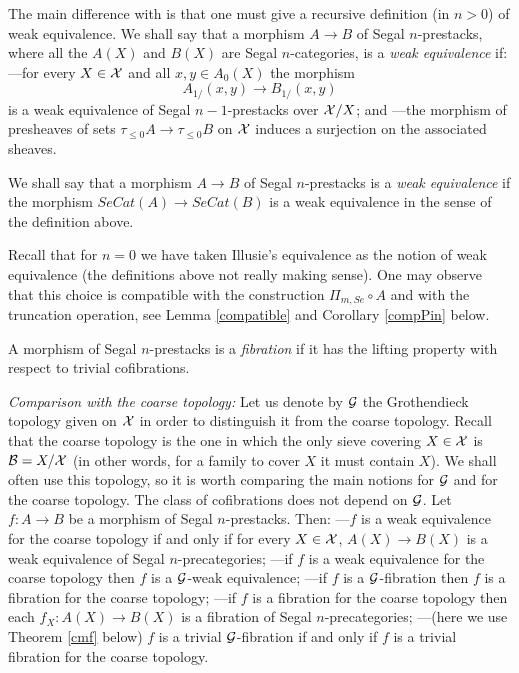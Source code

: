 The main difference with \cite{Jardine}
is that one must give a recursive definition (in $n>0$) of
weak equivalence. We shall say that a morphism $A\rightarrow B$ of Segal
$n$-prestacks,
where all
the $A(X)$ and $B(X)$ are Segal $n$-categories, is
a {\em weak equivalence} if:
\newline
---for every $X\in {\cal X}$ and all $x,y\in A_0(X)$ the morphism
$$
A_{1/}(x,y)\rightarrow B_{1/}(x,y)
$$
is a weak equivalence of Segal $n-1$-prestacks over
${\cal X} /X$;
and
\newline
---the morphism of presheaves of sets
$\tau _{\leq 0} A\rightarrow \tau _{\leq 0}B$ on ${\cal X}$
induces a surjection on the associated sheaves.

We shall say that a morphism $A\rightarrow B$ of Segal $n$-prestacks is
a {\em
weak equivalence} if the morphism $SeCat(A)\rightarrow SeCat(B)$ is a
weak equivalence in the sense of the definition above.

Recall that for $n=0$ we have taken Illusie's equivalence as the notion
of weak
equivalence (the definitions above not really making sense).
One may observe that this choice is compatible with the construction $\Pi
_{m,Se}\circ A$ and with the truncation operation, see Lemma \ref{compatible}
and Corollary \ref{compPin} below.


A morphism of Segal $n$-prestacks is a {\em fibration} if it has
the lifting property with respect to
trivial cofibrations.


{\em Comparison with the coarse topology:}
Let us denote by ${\cal G}$ the Grothendieck topology given on ${\cal X}$ in order
to distinguish it from the
coarse topology.
Recall that the coarse topology is the one in which the only sieve
covering $X\in {\cal X}$ is
${\cal B} = X/{\cal X}$ (in other words, for a family to cover $X$ it must
contain $X$).
We shall often use this topology, so it is worth comparing the main
notions for
${\cal G}$ and for the coarse topology.  The class of cofibrations does
not depend on
${\cal G}$. Let $f:A\rightarrow
B$ be a morphism of Segal $n$-prestacks. Then:
\newline
---$f$ is a
weak equivalence for the coarse topology if and only if for every
$X\in {\cal X}$, $A(X)\rightarrow B(X)$ is a weak equivalence of Segal $n$-precategories;
\newline
---if $f$ is a weak equivalence for the coarse topology then $f$
is a ${\cal G}$-weak equivalence;
\newline
---if $f$ is a ${\cal G}$-fibration then $f$ is a fibration for the coarse
topology;
\newline
---if $f$ is a fibration for the coarse topology then each $f_X:
A(X)\rightarrow B(X)$ is a fibration of Segal $n$-precategories;
\newline
---(here we use Theorem \ref{cmf} below) $f$ is a
trivial ${\cal G}$-fibration
if and only if $f$ is a trivial fibration for the coarse topology.

